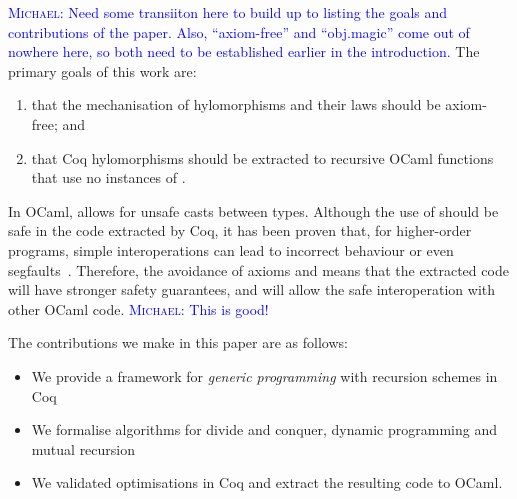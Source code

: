\documentclass[anonymous, a4paper, UKenglish, cleveref, autoref, thm-restate]{lipics-v2021}
\newcommand{\mvol}[1]{\textcolor{blue}{\textsc{Michael}: #1}}
\newcommand{\cata}[1]{\lbans #1 \rbans}
\newcommand{\ana}[1]{\llens #1 \rlens}
\newcommand{\comp}{\cdot}
\newcommand{\operator}[1]{\textsf{#1}}
\newcommand{\InOp}{\operator{in}^{\circ}}
\newcommand{\OutOp}{\operator{out}^{\circ}}
\begin{document}
\mvol{Need some transiiton here to build up to listing the goals and contributions of the paper. Also, ``axiom-free'' and ``obj.magic'' come out of nowhere here, so both need to be established earlier in the introduction.}
The primary goals of this work are:
\begin{enumerate}
  \item that the
  mechanisation of hylomorphisms and their laws should be axiom-free; and
  \item that Coq
hylomorphisms should be extracted to recursive OCaml functions that use no
instances of .
\end{enumerate}
In OCaml,  allows for unsafe casts between types.
Although the use of  should be safe in the code
extracted by Coq, it has been proven that, for higher-order programs, simple
interoperations can lead to incorrect behaviour or even
segfaults~\cite{forster:hal-04329663}. Therefore, the avoidance of axioms and
 means that the extracted code will have stronger
safety guarantees, and will allow the safe interoperation with other OCaml code.
\mvol{This is good!}

The contributions we make in this paper are as follows:
\begin{itemize}
  \item We provide a framework for \emph{generic programming} with recursion
schemes in Coq
  \item We formalise algorithms for divide and conquer, dynamic programming and
mutual recursion
  \item We validated optimisations in Coq and extract the resulting code to
OCaml.
\end{itemize}

\end{document}
